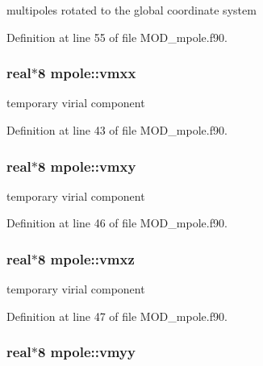 multipoles rotated to the global coordinate system 



Definition at line 55 of file M\-O\-D\-\_\-mpole.\-f90.

\hypertarget{classmpole_a5125a1d93c843fb12e7e93c2d0db9a22}{
\subsubsection[{vmxx}]{\setlength{\rightskip}{0pt plus 5cm}real$\ast$8 mpole\-::vmxx}}\label{classmpole_a5125a1d93c843fb12e7e93c2d0db9a22}


temporary virial component 



Definition at line 43 of file M\-O\-D\-\_\-mpole.\-f90.

\hypertarget{classmpole_a0b4e139e326dd548da6641c550f5b9cd}{
\subsubsection[{vmxy}]{\setlength{\rightskip}{0pt plus 5cm}real$\ast$8 mpole\-::vmxy}}\label{classmpole_a0b4e139e326dd548da6641c550f5b9cd}


temporary virial component 



Definition at line 46 of file M\-O\-D\-\_\-mpole.\-f90.

\hypertarget{classmpole_ab6d3d975fb3b36405048af1afc811a8f}{
\subsubsection[{vmxz}]{\setlength{\rightskip}{0pt plus 5cm}real$\ast$8 mpole\-::vmxz}}\label{classmpole_ab6d3d975fb3b36405048af1afc811a8f}


temporary virial component 



Definition at line 47 of file M\-O\-D\-\_\-mpole.\-f90.

\hypertarget{classmpole_ab856a6193585e78195db20ad8237f1d0}{
\subsubsection[{vmyy}]{\setlength{\rightskip}{0pt plus 5cm}real$\ast$8 mpole\-::vmyy}}\label{classmpole_ab856a6193585e78195db20ad8237f1d0}


